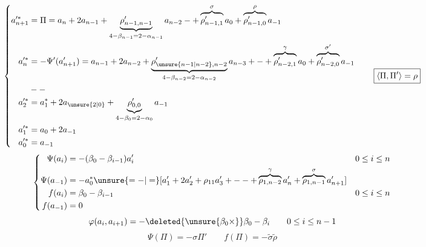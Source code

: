 \[
\left\{\begin{aligned}
a_{n+1}'^*&=\Pi=a_n+2a_{n-1}
+\underbrace{\rho'_{n-1,n-1}}_{4-\beta_{n-1}=2-\alpha_{n-1}}a_{n-2}
\mathbin{-}+
\overbrace{\rho'_{n-1,1}}^\sigma a_0+
\overbrace{\rho'_{n-1,0}}^\rho a_{-1}\\
a_n'^*&=-\Psi'(a'_{n+1})=a_{n-1}+2a_{n-2}
+\underbrace{\rho'_{\unsure{n-1|n-2},n-2}}_{4-\beta_{n-2}=2-\alpha_{n-2}}a_{n-3}
+\mathbin{-}+
\overbrace{\rho'_{n-2,1}}^\gamma a_0+
\overbrace{\rho'_{n-2,0}}^{\sigma'}a_{-1}\\
&\mathbin{-}\mathbin{-}\\
a_2'^*&=a_1^*+2a_{\unsure{2|0}}+
\underbrace{\rho'_{0,0}}_{4-\beta_0=2-\alpha_0}a_{-1}\\
a_1'^*&=a_0+2a_{-1}\\
a_0'^*&=a_{-1}
\end{aligned}\right.
\qquad \boxed{\langle\Pi,\Pi'\rangle=\rho}
\]
\[
\left\{\begin{aligned}
\Psi(a_i)&=-(\beta_0\mathbin{-}\beta_{i-1})a'_i
&&0\leq i\leq n\\
\Psi(a_{-1})&=-a_0^*\unsure{=-|=}
[a'_1+2a'_2+\rho_{11}a'_3+\mathbin{-}\mathbin{-}
+\overbrace{\rho_{1,n-2}}^\gamma a'_n+
\overbrace{\rho_{1,n-1}}^\sigma a'_{n+1}]\\
f(a_i)&=\beta_0\mathbin{-}\beta_{i-1}&&0\leq i\leq n\\
f(a_{-1})&=0
\end{aligned}\right.
\]
\margin{\[
f(a_0)=1,\quad f(a_1)=\beta_0,\mathbin{-},\quad
f(a_n)=\beta_0\mathbin{-}\beta_{n-1}=\unsure{B|\beta}
\]}
\[
\varphi(a_i,a_{i+1})=-\deleted{\unsure{\beta_0\times}}\beta_0\mathbin{-}\beta_i
\qquad0\leq i\leq n-1
\]
\[
\Psi(\Pi)=-\sigma\Pi'\qquad
f(\Pi)=-\widetilde\sigma\widetilde\rho
\]

